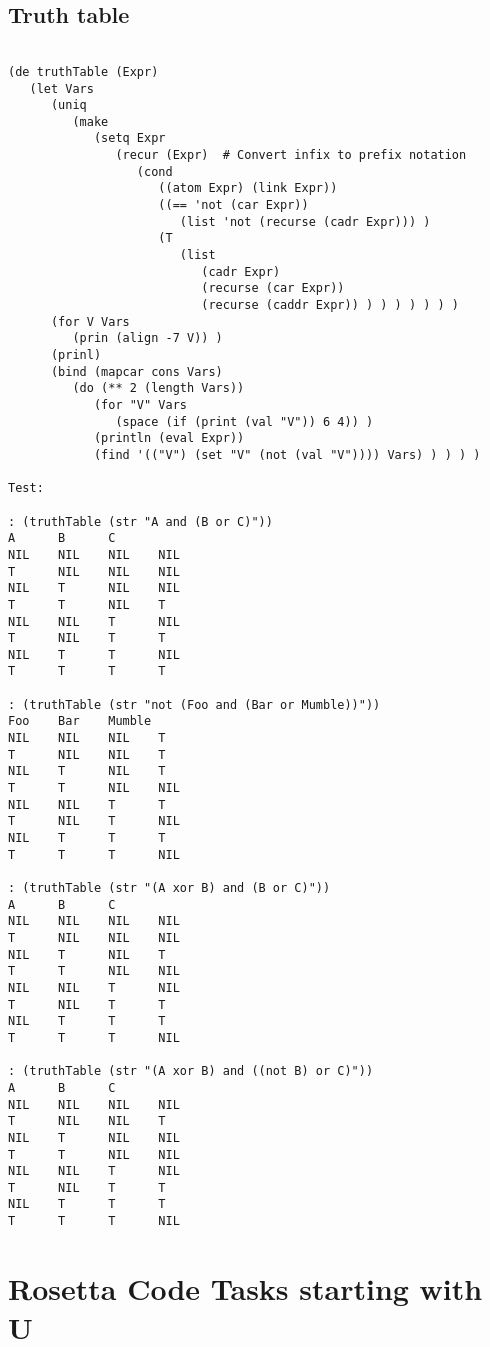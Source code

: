 \section*{Truth table}

\begin{verbatim}

(de truthTable (Expr)
   (let Vars
      (uniq
         (make
            (setq Expr
               (recur (Expr)  # Convert infix to prefix notation
                  (cond
                     ((atom Expr) (link Expr))
                     ((== 'not (car Expr))
                        (list 'not (recurse (cadr Expr))) )
                     (T
                        (list
                           (cadr Expr)
                           (recurse (car Expr))
                           (recurse (caddr Expr)) ) ) ) ) ) ) )
      (for V Vars
         (prin (align -7 V)) )
      (prinl)
      (bind (mapcar cons Vars)
         (do (** 2 (length Vars))
            (for "V" Vars
               (space (if (print (val "V")) 6 4)) )
            (println (eval Expr))
            (find '(("V") (set "V" (not (val "V")))) Vars) ) ) ) )

Test:

: (truthTable (str "A and (B or C)"))
A      B      C
NIL    NIL    NIL    NIL
T      NIL    NIL    NIL
NIL    T      NIL    NIL
T      T      NIL    T
NIL    NIL    T      NIL
T      NIL    T      T
NIL    T      T      NIL
T      T      T      T

: (truthTable (str "not (Foo and (Bar or Mumble))"))
Foo    Bar    Mumble
NIL    NIL    NIL    T
T      NIL    NIL    T
NIL    T      NIL    T
T      T      NIL    NIL
NIL    NIL    T      T
T      NIL    T      NIL
NIL    T      T      T
T      T      T      NIL

: (truthTable (str "(A xor B) and (B or C)"))
A      B      C
NIL    NIL    NIL    NIL
T      NIL    NIL    NIL
NIL    T      NIL    T
T      T      NIL    NIL
NIL    NIL    T      NIL
T      NIL    T      T
NIL    T      T      T
T      T      T      NIL

: (truthTable (str "(A xor B) and ((not B) or C)"))
A      B      C
NIL    NIL    NIL    NIL
T      NIL    NIL    T
NIL    T      NIL    NIL
T      T      NIL    NIL
NIL    NIL    T      NIL
T      NIL    T      T
NIL    T      T      T
T      T      T      NIL

\end{verbatim}

\chapter{Rosetta Code Tasks starting with U}

